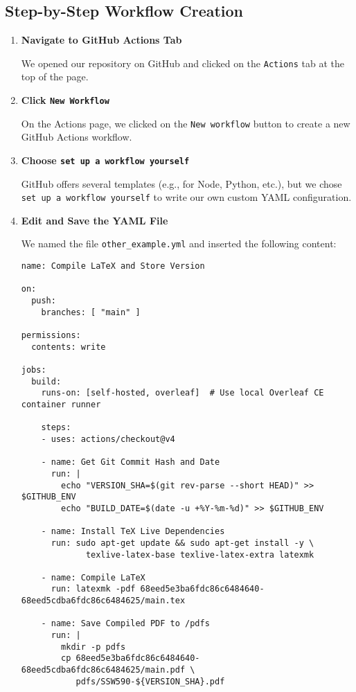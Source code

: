 \subsection{Step-by-Step Workflow Creation}

\begin{enumerate}
    \item \textbf{Navigate to GitHub Actions Tab}

    We opened our repository on GitHub and clicked on the \texttt{Actions} tab at the top of the page.

    \item \textbf{Click \texttt{New Workflow}}

    On the Actions page, we clicked on the \texttt{New workflow} button to create a new GitHub Actions workflow.

    \item \textbf{Choose \texttt{set up a workflow yourself}}

    GitHub offers several templates (e.g., for Node, Python, etc.), but we chose \texttt{set up a workflow yourself} to write our own custom YAML configuration.

    \item \textbf{Edit and Save the YAML File}

    We named the file \texttt{other\_example.yml} and inserted the following content:

    \begin{verbatim}
name: Compile LaTeX and Store Version

on:
  push:
    branches: [ "main" ]

permissions:
  contents: write

jobs:
  build:
    runs-on: [self-hosted, overleaf]  # Use local Overleaf CE container runner

    steps:
    - uses: actions/checkout@v4

    - name: Get Git Commit Hash and Date
      run: |
        echo "VERSION_SHA=$(git rev-parse --short HEAD)" >> $GITHUB_ENV
        echo "BUILD_DATE=$(date -u +%Y-%m-%d)" >> $GITHUB_ENV

    - name: Install TeX Live Dependencies
      run: sudo apt-get update && sudo apt-get install -y \
             texlive-latex-base texlive-latex-extra latexmk

    - name: Compile LaTeX
      run: latexmk -pdf 68eed5e3ba6fdc86c6484640-68eed5cdba6fdc86c6484625/main.tex

    - name: Save Compiled PDF to /pdfs
      run: |
        mkdir -p pdfs
        cp 68eed5e3ba6fdc86c6484640-68eed5cdba6fdc86c6484625/main.pdf \
           pdfs/SSW590-${VERSION_SHA}.pdf


\end{verbatim}
\end{enumerate}
